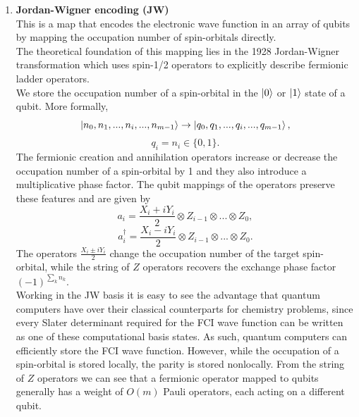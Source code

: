 \begin{enumerate}
    \item \textbf{Jordan-Wigner encoding (JW)} \\
    This is a map that encodes the electronic wave function in an array of qubits by mapping the occupation number of spin-orbitals directly. \\
    The theoretical foundation of this mapping lies in the 1928 Jordan-Wigner transformation which uses spin-1/2 operators to explicitly describe fermionic ladder operators. \\
    We store the occupation number of a spin-orbital in the $\ket{0}$ or $\ket{1}$ state of a qubit. More formally,
    \begin{equation}
        \ket{n_0,n_1,...,n_i,...,n_{m-1}} \rightarrow \ket{q_0,q_1,...,q_i,...,q_{m-1}},
    \end{equation}
    \begin{equation}
        q_i = n_i \in \{ 0,1 \}.
    \end{equation}
    The fermionic creation and annihilation operators increase or decrease the occupation number of a spin-orbital by 1 and they also introduce a multiplicative phase factor. The qubit mappings of the operators preserve these features and are given by
    \begin{equation}
        a_i = \frac{X_i + iY_i}{2} \otimes Z_{i-1} \otimes ... \otimes Z_{0},
    \end{equation}
    \begin{equation}
        a^{\dagger}_i = \frac{X_i - iY_i}{2} \otimes Z_{i-1} \otimes ... \otimes Z_{0}.
    \end{equation}
    The operators $\frac{X_i \pm iY_i}{2}$ change the occupation number of the target spin-orbital, while the string of $Z$ operators recovers the exchange phase factor $(-1)^{\sum_k n_k}$. \\
    Working in the JW basis it is easy to see the advantage that quantum computers have over their classical counterparts for chemistry problems, since every Slater determinant required for the FCI wave function can be written as one of these computational basis states. As such, quantum computers can efficiently store the FCI wave function.
    However, while the occupation of a spin-orbital is stored locally, the parity is stored nonlocally. From the string of $Z$ operators we can see that a fermionic operator mapped to qubits generally has a weight of $O(m)$ Pauli operators, each acting on a different qubit.
    

\end{enumerate}

